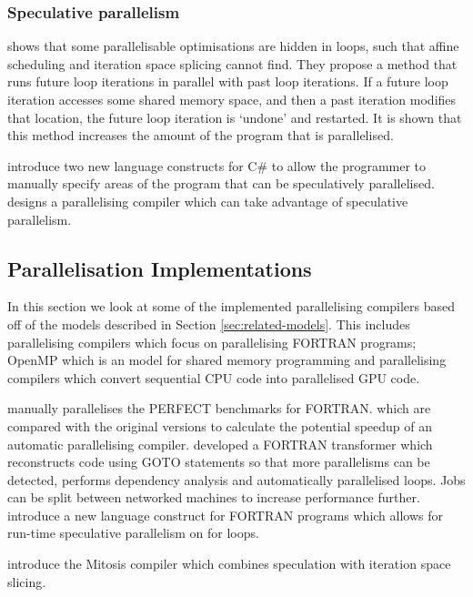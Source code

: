\documentclass[conference]{IEEEtran}
\begin{document}
\subsubsection{Speculative parallelism}
\textcite{Zhong2008} shows that some parallelisable optimisations are hidden in loops, such that affine scheduling and iteration space splicing cannot find. They propose a method that runs future loop iterations in parallel with past loop iterations. If a future loop iteration accesses some shared memory space, and then a past iteration modifies that location, the future loop iteration is `undone' and restarted. It is shown that this method increases the amount of the program that is parallelised.

\textcite{Prabhu2010} introduce two new language constructs for C\# to allow the programmer to manually specify areas of the program that can be speculatively parallelised. \textcite{Yiapanis2015} designs a parallelising compiler which can take advantage of speculative parallelism.

\subsection{Parallelisation Implementations}
In this section we look at some of the implemented parallelising compilers based off of the models described in Section \ref{sec:related-models}. This includes parallelising compilers which focus on parallelising FORTRAN programs; OpenMP which is an model for shared memory programming and parallelising compilers which convert sequential CPU code into parallelised GPU code.

\textcite{Eigenmann1998} manually parallelises the PERFECT benchmarks for FORTRAN. which are compared with the original versions to calculate the potential speedup of an automatic parallelising compiler.
\textcite{DHollander1998} developed a FORTRAN transformer which reconstructs code using GOTO statements so that more parallelisms can be detected, performs dependency analysis and automatically parallelised loops. Jobs can be split between networked machines to increase performance further.
\textcite{Rauchwerger1999} introduce a new language construct for FORTRAN programs which allows for run-time speculative parallelism on for loops. 

\textcite{Quinones2005} introduce the Mitosis compiler which combines speculation with iteration space slicing. 
\end{document}
